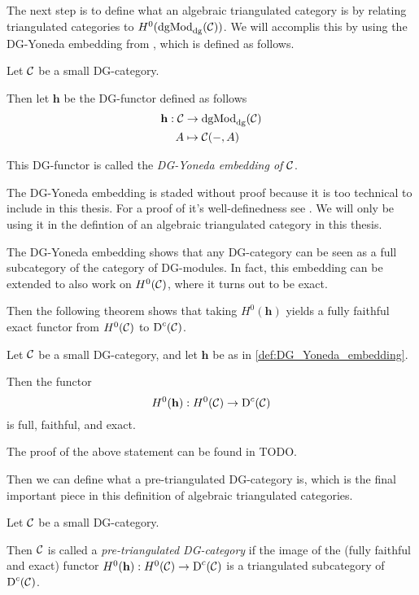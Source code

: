 The next step is to define what an algebraic triangulated category is by relating triangulated categories to \( H^0(\operatorname{dgMod}_{\operatorname{dg}}({\mathcal{C}})) \). We will accomplis this by using the DG-Yoneda embedding from \cite[Corollary 6.3.6]{Borceux_1994}, which is defined as follows.
\begin{definition}
    \label{def:DG_Yoneda_embedding}
    Let \( {\mathcal{C}} \) be a small DG-category.
    
    Then let \( \mathbf{h} \) be the DG-functor defined as follows
    \begin{align*}
        \mathbf{h}: {\mathcal{C}} &\to \operatorname{dgMod}_{\operatorname{dg}}({\mathcal{C}}) \\
        A &\mapsto {\mathcal{C}}(-, A)
    \end{align*}

    This DG-functor is called the \emph{DG-Yoneda embedding of \( {\mathcal{C}} \)}.
\end{definition}

The DG-Yoneda embedding is staded without proof because it is too technical to include in this thesis. For a proof of it's well-definedness see \cite[Corollary 6.3.6]{Borceux_1994}. We will only be using it in the defintion of an algebraic triangulated category in this thesis.

The DG-Yoneda embedding shows that any DG-category can be seen as a full subcategory of the category of DG-modules. In fact, this embedding can be extended to also work on \( H^0({\mathcal{C}}) \), where it turns out to be exact.

Then the following theorem shows that taking \( H^0(\mathbf{h}) \) yields a fully faithful exact functor from \( H^0({\mathcal{C}}) \) to \( \operatorname{D}^c({\mathcal{C}}) \).

\begin{theorem}
    Let \( {\mathcal{C}} \) be a small DG-category, and let \( \mathbf{h} \) be as in \autoref{def:DG_Yoneda_embedding}.

    Then the functor
    \[
        H^0(\mathbf{h}): H^0({\mathcal{C}}) \to \operatorname{D}^c({\mathcal{C}})
    \]
    is full, faithful, and exact.
\end{theorem}
The proof of the above statement can be found in TODO.

Then we can define what a pre-triangulated DG-category is, which is the final important piece in this definition of algebraic triangulated categories.
\begin{definition}
    Let \( {\mathcal{C}} \) be a small DG-category.

    Then \( {\mathcal{C}} \) is called a \emph{pre-triangulated DG-category} if the image of the (fully faithful and exact) functor \( H^0(\mathbf{h}): H^0({\mathcal{C}}) \to \operatorname{D}^c({\mathcal{C}}) \) is a triangulated subcategory of \( \operatorname{D}^c({\mathcal{C}}) \).
\end{definition}

